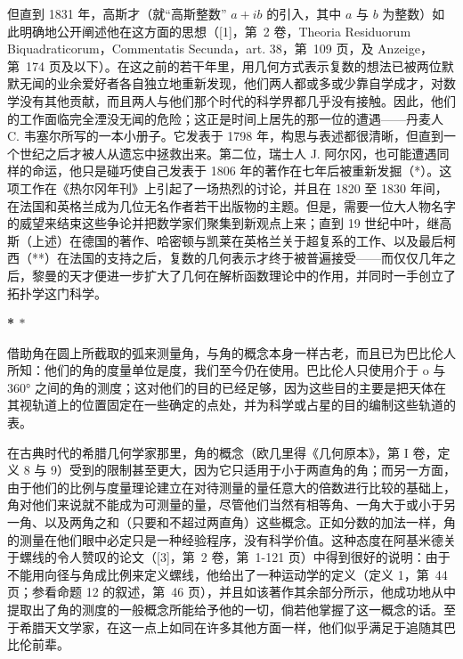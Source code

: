 但直到 1831 年，高斯才（就“高斯整数” \(a + ib\) 的引入，其中 \(a\) 与 \(b\) 为整数）如此明确地公开阐述他在这方面的思想（{[}1{]}，第~2 卷，Theoria Residuorum Biquadraticorum，Commentatis Secunda，art. 38，第~109 页，及 Anzeige，第~174 页及以下）。在这之前的若干年里，用几何方式表示复数的想法已被两位默默无闻的业余爱好者各自独立地重新发现，他们两人都或多或少靠自学成才，对数学没有其他贡献，而且两人与他们那个时代的科学界都几乎没有接触。因此，他们的工作面临完全湮没无闻的危险；这正是时间上居先的那一位的遭遇——丹麦人 C. 韦塞尔所写的一本小册子。它发表于 1798 年，构思与表述都很清晰，但直到一个世纪之后才被人从遗忘中拯救出来。第二位，瑞士人 J. 阿尔冈，也可能遭遇同样的命运，他只是碰巧使自己发表于 1806 年的著作在七年后被重新发掘（*）。这项工作在《热尔冈年刊》上引起了一场热烈的讨论，并且在 1820 至 1830 年间，在法国和英格兰成为几位无名作者若干出版物的主题。但是，需要一位大人物名字的威望来结束这些争论并把数学家们聚集到新观点上来；直到 19 世纪中叶，继高斯（上述）在德国的著作、哈密顿与凯莱在英格兰关于超复系的工作、以及最后柯西（**）在法国的支持之后，复数的几何表示才终于被普遍接受——而仅仅几年之后，黎曼的天才便进一步扩大了几何在解析函数理论中的作用，并同时一手创立了拓扑学这门科学。

\par\noindent\textbf{* \(\ast\)}\par

借助角在圆上所截取的弧来测量角，与角的概念本身一样古老，而且已为巴比伦人所知：他们的角的度量单位是度，我们至今仍在使用。巴比伦人只使用介于 o 与 360° 之间的角的测度；这对他们的目的已经足够，因为这些目的主要是把天体在其视轨道上的位置固定在一些确定的点处，并为科学或占星的目的编制这些轨道的表。

在古典时代的希腊几何学家那里，角的概念（欧几里得《几何原本》，第 I 卷，定义 8 与 9）受到的限制甚至更大，因为它只适用于小于两直角的角；而另一方面，由于他们的比例与度量理论建立在对待测量的量任意大的倍数进行比较的基础上，角对他们来说就不能成为可测量的量，尽管他们当然有相等角、一角大于或小于另一角、以及两角之和（只要和不超过两直角）这些概念。正如分数的加法一样，角的测量在他们眼中必定只是一种经验程序，没有科学价值。这种态度在阿基米德关于螺线的令人赞叹的论文（{[}3{]}，第~2 卷，第~1-121 页）中得到很好的说明：由于不能用向径与角成比例来定义螺线，他给出了一种运动学的定义（定义 1，第~44 页；参看命题 12 的叙述，第~46 页），并且如该著作其余部分所示，他成功地从中提取出了角的测度的一般概念所能给予他的一切，倘若他掌握了这一概念的话。至于希腊天文学家，在这一点上如同在许多其他方面一样，他们似乎满足于追随其巴比伦前辈。


